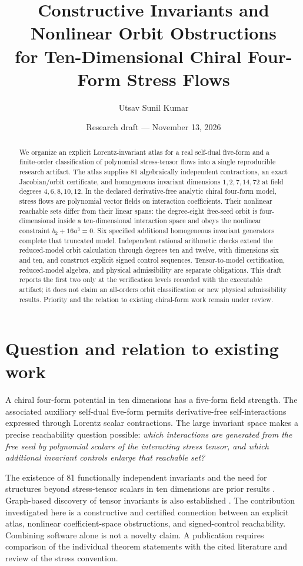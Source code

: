 \documentclass[11pt]{article}
\title{Constructive Invariants and Nonlinear Orbit Obstructions\\for Ten-Dimensional Chiral Four-Form Stress Flows}
\author{Utsav Sunil Kumar}
\date{Research draft --- November 13, 2026}
\begin{document}
\maketitle
\begin{abstract}
We organize an explicit Lorentz-invariant atlas for a real self-dual five-form
and a finite-order classification of polynomial stress-tensor flows into a
single reproducible research artifact. The atlas supplies 81 algebraically
independent contractions, an exact Jacobian/orbit certificate, and homogeneous
invariant dimensions $1,2,7,14,72$ at field degrees $4,6,8,10,12$.
In the declared derivative-free analytic chiral four-form model, stress flows
are polynomial vector fields on interaction coefficients. Their nonlinear
reachable sets differ from their linear spans: the degree-eight free-seed orbit
is four-dimensional inside a ten-dimensional interaction space and obeys the
nonlinear constraint $b_2+16a^3=0$. Six specified additional homogeneous
invariant generators complete that truncated model. Independent rational
arithmetic checks extend the reduced-model orbit calculation through degrees
ten and twelve, with dimensions six and ten, and construct explicit signed
control sequences. Tensor-to-model certification, reduced-model algebra,
and physical admissibility are separate obligations. This draft reports the
first two only at the verification levels recorded with the executable artifact;
it does not claim an all-orders orbit classification or new physical admissibility
results. Priority and the relation to existing chiral-form work remain under review.
\end{abstract}

\section{Question and relation to existing work}
A chiral four-form potential in ten dimensions has a five-form field strength.
The associated auxiliary self-dual five-form permits derivative-free
self-interactions expressed through Lorentz scalar contractions.
The large invariant space makes a precise reachability question possible:
\emph{which interactions are generated from the free seed by polynomial
scalars of the interacting stress tensor, and which additional invariant
controls enlarge that reachable set?}

The existence of 81 functionally independent invariants and the need for
structures beyond stress-tensor scalars in ten dimensions are prior results
\cite{HLS,CHKL}. Graph-based discovery of tensor invariants is also established
\cite{EFS}. The contribution investigated here is a constructive and certified
connection between an explicit atlas, nonlinear coefficient-space obstructions,
and signed-control reachability. Combining software alone is not a novelty
claim. A publication requires comparison of the individual theorem statements
with the cited literature and review of the stress convention.
\end{document}
